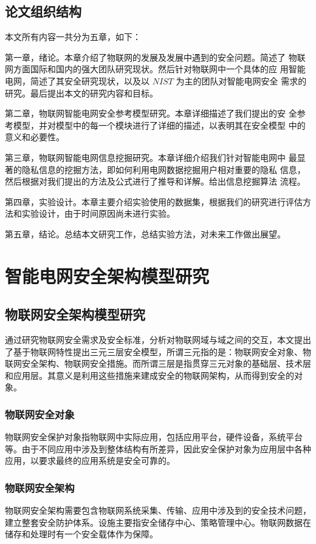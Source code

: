 \documentclass[10.5pt,twocolumn]{jbuaa}
\begin{document}
\subsection{论文组织结构}
本文所有内容一共分为五章，如下：

第一章，绪论。本章介绍了物联网的发展及发展中遇到的安全问题。简述了
物联网方面国际和国内的强大团队研究现状。然后针对物联网中一个具体的应
用智能电网，简述了其安全研究现状，以及以 $NIST$ 为主的团队对智能电网安全
需求的研究。最后提出本文的研究内容和目标。

第二章，物联网智能电网安全参考模型研究。本章详细描述了我们提出的安
全参考模型，并对模型中的每一个模块进行了详细的描述，以表明其在安全模型
中的意义和必要性。

第三章，物联网智能电网信息挖掘研究。本章详细介绍我们针对智能电网中
最显著的隐私信息的挖掘方法，即如何利用电网数据挖掘用户相对重要的隐私
信息，然后根据对我们提出的方法及公式进行了推导和详解。给出信息挖掘算法
流程。

第四章，实验设计。本章主要介绍实验使用的数据集，根据我们的研究进行评估方法和实验设计，由于时间原因尚未进行实验。

第五章，结论。总结本文研究工作，总结实验方法，对未来工作做出展望。

\section{智能电网安全架构模型研究}
\subsection{物联网安全架构模型研究}
通过研究物联网安全需求及安全标准，分析对物联网域与域之间的交互，本文提出了基于物联网特性提出三元三层安全模型，所谓三元指的是：物联网安全对象、物联网安全架构、物联网安全措施。而所谓三层是指贯穿三元对象的基础层、技术层和应用层。其意义是利用这些措施来建成安全的物联网架构，从而得到安全的对象。

\subsubsection{物联网安全对象}
物联网安全保护对象指物联网中实际应用，包括应用平台，硬件设备，系统平台等。由于不同应用中涉及到整体结构有所差异，因此安全保护对象为应用层中各种应用，以要求最终的应用系统是安全可靠的。

\subsubsection{物联网安全架构}
物联网安全架构需要包含物联网系统采集、传输、应用中涉及到的安全技术问题，建立整套安全防护体系。设施主要指安全储存中心、策略管理中心。物联网数据在储存和处理时有一个安全载体作为保障。
\end{document}
